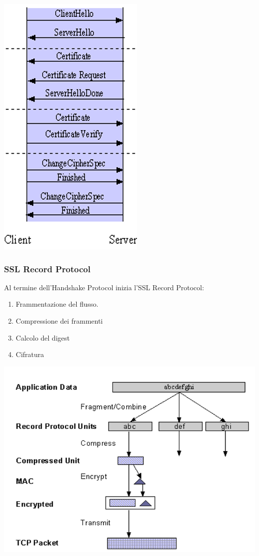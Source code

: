             \begin{center}
                \includegraphics[scale=0.45]{chapters/7/assets/schema_zf.png}
            \end{center}

        \subsubsection{SSL Record Protocol}
            Al termine dell'Handshake Protocol inizia l'SSL Record Protocol:
            \begin{enumerate}
                \item Frammentazione del flusso.
                \item Compressione dei frammenti
                \item Calcolo del digest
                \item Cifratura
            \end{enumerate}

            \begin{center}
                \includegraphics[scale=0.4]{chapters/7/assets/schema_zg.png}
            \end{center}

